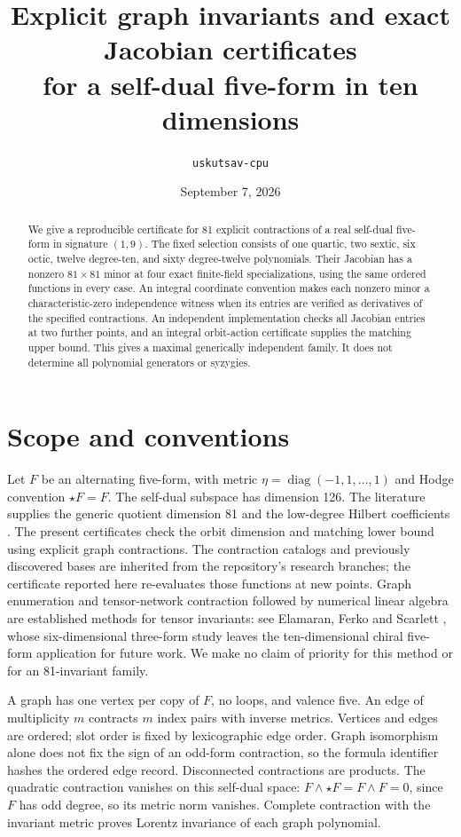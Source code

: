 \documentclass[11pt]{article}
\title{Explicit graph invariants and exact Jacobian certificates\\
for a self-dual five-form in ten dimensions}
\author{\texttt{uskutsav-cpu}}
\date{September 7, 2026}
\begin{document}
\maketitle
\begin{abstract}
We give a reproducible certificate for 81 explicit contractions of a real
self-dual five-form in signature $(1,9)$. The fixed selection consists of one
quartic, two sextic, six octic, twelve degree-ten, and sixty degree-twelve
polynomials. Their Jacobian has a nonzero $81\times81$ minor at four exact
finite-field specializations, using the same ordered functions in every
case. An integral coordinate convention makes each nonzero minor a
characteristic-zero independence witness when its entries are verified as
derivatives of the specified contractions. An independent implementation
checks all Jacobian entries at two further points, and an integral orbit-action
certificate supplies the matching upper bound. This gives a maximal generically independent
family. It does not determine all polynomial generators or syzygies.
\end{abstract}

\section{Scope and conventions}
Let $F$ be an alternating five-form, with metric
$\eta=\operatorname{diag}(-1,1,\ldots,1)$ and Hodge convention
$\star F=F$. The self-dual subspace has dimension 126.
The literature supplies the generic quotient dimension 81 and the
low-degree Hilbert coefficients \cite{cederwall,hutomo}. The present
certificates check the orbit dimension and matching lower bound using explicit graph
contractions. The contraction catalogs and previously discovered bases are
inherited from the repository's research branches; the certificate reported
here re-evaluates those functions at new points.
Graph enumeration and tensor-network contraction followed by numerical linear
algebra are established methods for tensor invariants: see
Elamaran, Ferko and Scarlett \cite{elamaran}, whose six-dimensional three-form
study leaves the ten-dimensional chiral five-form application for future work.
We make no claim of priority for this method or for an 81-invariant family.

A graph has one vertex per copy of $F$, no loops, and valence five.
An edge of multiplicity $m$ contracts $m$ index pairs with inverse metrics.
Vertices and edges are ordered; slot order is fixed by lexicographic edge
order. Graph isomorphism alone does not fix the sign of an odd-form
contraction, so the formula identifier hashes the ordered edge record.
Disconnected contractions are products. The quadratic contraction vanishes
on this self-dual space: $F\wedge\star F=F\wedge F=0$, since $F$ has odd
degree, so its metric norm vanishes. Complete contraction with the invariant
metric proves Lorentz invariance of each graph polynomial.
\end{document}
